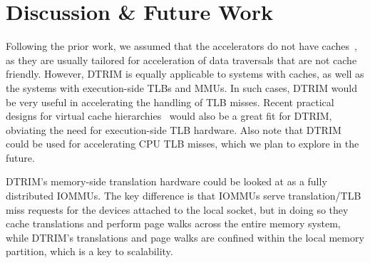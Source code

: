 \section{Discussion \& Future Work}
\label{sec:discussion}

Following the prior work, we assumed that the accelerators do not have caches~\cite{haria:devirtualizing, picorel:near-memory}, as they are usually tailored for acceleration of data traversals that are not cache friendly. However, DTRIM is equally applicable to systems with caches, as well as the systems with execution-side TLBs and MMUs. In such cases, DTRIM would be very useful in accelerating the handling of TLB misses. Recent practical designs for virtual cache hierarchies~\cite{yoon:revisiting, park:efficient} would also be a great fit for DTRIM, obviating the need for execution-side TLB hardware. Also note that DTRIM could be used for accelerating CPU TLB misses, which we plan to explore in the future. 

DTRIM's memory-side translation hardware could be looked at as a fully distributed IOMMUs. The key difference is that IOMMUs serve translation/TLB miss requests for the devices attached to the local socket, but in doing so they cache translations and perform page walks across the entire memory system, while DTRIM's translations and page walks are confined within the local memory partition, which is a key to scalability. 



